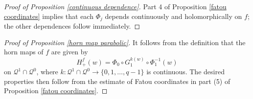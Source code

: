 \documentclass[12pt,letterpaper]{amsart}
\numberwithin{equation}{section}
\theoremstyle{remark}
\theoremstyle{definition}
\newcommand{\QQ}{\mathcal Q}
\begin{document}
	\begin{proof}[Proof of Proposition \ref{continuous dependence}]
		Part 4 of Proposition \ref{fatou coordinates} implies that each $\Phi_j$ depends continuously and holomorphically on $f$; the other dependences follow immediately.
	\end{proof}
	
	\begin{proof}[Proof of Proposition \ref{horn map parabolic}]
		It follows from the definition that the horn maps of $f$ are given by 
		$$H_+^f(w)= \Phi_{0}\circ G_1^{k(w)}\circ \Phi_{1}^{-1}(w)$$
		on $\QQ^1\cap \QQ^0$, where $k: \QQ^1\cap \QQ^0\to \{0, 1, \dots, q-1\}$ is continuous.
		The desired properties then follow  from the estimate of Fatou coordinates in part (5) of Proposition \ref{fatou coordinates}.		
	\end{proof}
	
\end{document}

